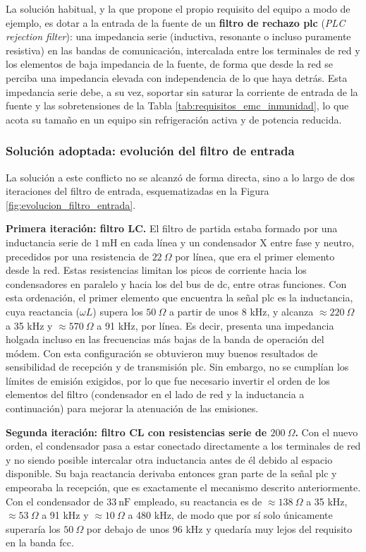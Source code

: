 La solución habitual, y la que propone el propio requisito del equipo a modo de ejemplo, es dotar a la entrada de la fuente de un \textbf{filtro de rechazo \gls{plc}} (\textit{PLC rejection filter}): una impedancia serie (inductiva, resonante o incluso puramente resistiva) en las bandas de comunicación, intercalada entre los terminales de red y los elementos de baja impedancia de la fuente, de forma que desde la red se perciba una impedancia elevada con independencia de lo que haya detrás. Esta impedancia serie debe, a su vez, soportar sin saturar la corriente de entrada de la fuente y las sobretensiones de la Tabla \ref{tab:requisitos_emc_inmunidad}, lo que acota su tamaño en un equipo sin refrigeración activa y de potencia reducida.

\subsubsection*{Solución adoptada: evolución del filtro de entrada}

La solución a este conflicto no se alcanzó de forma directa, sino a lo largo de dos iteraciones del filtro de entrada, esquematizadas en la Figura \ref{fig:evolucion_filtro_entrada}.

\textbf{Primera iteración: filtro LC.} El filtro de partida estaba formado por una inductancia serie de $1\ \text{mH}$ en cada línea y un condensador X entre fase y neutro, precedidos por una resistencia de $22\ \Omega$ por línea, que era el primer elemento desde la red. Estas resistencias limitan los picos de corriente hacia los condensadores en paralelo y hacia los del bus de \gls{dc}, entre otras funciones. Con esta ordenación, el primer elemento que encuentra la señal \gls{plc} es la inductancia, cuya reactancia ($\omega L$) supera los $50\ \Omega$ a partir de unos 8 kHz, y alcanza $\approx 220\ \Omega$ a 35 kHz y $\approx 570\ \Omega$ a 91 kHz, por línea. Es decir, presenta una impedancia holgada incluso en las frecuencias más bajas de la banda de operación del módem. Con esta configuración se obtuvieron muy buenos resultados de sensibilidad de recepción y de transmisión \gls{plc}. Sin embargo, no se cumplían los límites de emisión exigidos, por lo que fue necesario invertir el orden de los elementos del filtro (condensador en el lado de red y la inductancia a continuación) para mejorar la atenuación de las emisiones.

\textbf{Segunda iteración: filtro CL con resistencias serie de $200\ \Omega$.} Con el nuevo orden, el condensador pasa a estar conectado directamente a los terminales de red y no siendo posible intercalar otra inductancia antes de él debido al espacio disponible. Su baja reactancia derivaba entonces gran parte de la señal \gls{plc} y empeoraba la recepción, que es exactamente el mecanismo descrito anteriormente. Con el condensador de $33\ \text{nF}$ empleado, su reactancia es de $\approx 138\ \Omega$ a 35 kHz, $\approx 53\ \Omega$ a 91 kHz y $\approx 10\ \Omega$ a 480 kHz, de modo que por sí solo únicamente superaría los $50\ \Omega$ por debajo de unos 96 kHz y quedaría muy lejos del requisito en la banda \gls{fcc}.

